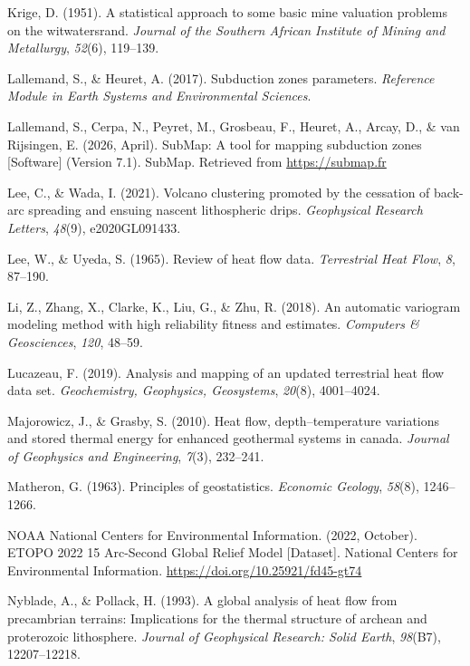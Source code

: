 \documentclass[draft,linenumbers]{agujournal2019}
\newlength{\cslhangindent}
\newenvironment{CSLReferences}[2]
 {\begin{list}{}{
  \setlength{\itemindent}{0pt}
  \setlength{\leftmargin}{0pt}
  \setlength{\parsep}{0pt}
  \ifodd #1
   \setlength{\leftmargin}{\cslhangindent}
   \setlength{\itemindent}{-\cslhangindent}
  \fi
  \setlength{\itemsep}{#2\baselineskip}
  }
  \item\relax}
 {\end{list}}
\begin{document}
\begin{CSLReferences}{1}{0}
Krige, D. (1951). A statistical approach to some basic mine valuation
problems on the witwatersrand. \emph{Journal of the Southern African
Institute of Mining and Metallurgy}, \emph{52}(6), 119--139.

Lallemand, S., \& Heuret, A. (2017). Subduction zones parameters.
\emph{Reference Module in Earth Systems and Environmental Sciences}.

{Lallemand, S., Cerpa, N., Peyret, M., Grosbeau, F., Heuret, A., Arcay,
D., \& van Rijsingen, E.} (2026, April). {SubMap: A tool for mapping
subduction zones {[}Software{]}} (Version 7.1). {SubMap}. Retrieved from
\url{https://submap.fr}

Lee, C., \& Wada, I. (2021). Volcano clustering promoted by the
cessation of back-arc spreading and ensuing nascent lithospheric drips.
\emph{Geophysical Research Letters}, \emph{48}(9), e2020GL091433.

Lee, W., \& Uyeda, S. (1965). Review of heat flow data.
\emph{Terrestrial Heat Flow}, \emph{8}, 87--190.

Li, Z., Zhang, X., Clarke, K., Liu, G., \& Zhu, R. (2018). An automatic
variogram modeling method with high reliability fitness and estimates.
\emph{Computers \& Geosciences}, \emph{120}, 48--59.

Lucazeau, F. (2019). Analysis and mapping of an updated terrestrial heat
flow data set. \emph{Geochemistry, Geophysics, Geosystems},
\emph{20}(8), 4001--4024.

Majorowicz, J., \& Grasby, S. (2010). Heat flow, depth--temperature
variations and stored thermal energy for enhanced geothermal systems in
canada. \emph{Journal of Geophysics and Engineering}, \emph{7}(3),
232--241.

Matheron, G. (1963). Principles of geostatistics. \emph{Economic
Geology}, \emph{58}(8), 1246--1266.

NOAA National Centers for Environmental Information. (2022, October).
{ETOPO 2022 15 Arc-Second Global Relief Model {[}Dataset{]}}. {National
Centers for Environmental Information}.
\url{https://doi.org/10.25921/fd45-gt74}

Nyblade, A., \& Pollack, H. (1993). A global analysis of heat flow from
precambrian terrains: Implications for the thermal structure of archean
and proterozoic lithosphere. \emph{Journal of Geophysical Research:
Solid Earth}, \emph{98}(B7), 12207--12218.


\end{CSLReferences}
\end{document}
